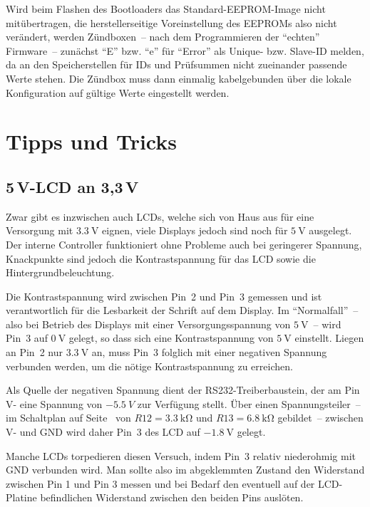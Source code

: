 \documentclass[paper=a4, parskip, numbers=noenddot, toc=listof, headsepline]{scrbook}
\begin{document}
				Wird beim Flashen des Bootloaders das Standard-EEPROM-Image nicht mitübertragen, die herstellerseitige Voreinstellung des EEPROMs also nicht verändert, werden Zündboxen~-- nach dem Programmieren der \enquote{echten} Firmware~-- zunächst \enquote{E} bzw. \enquote{e} für \enquote{Error} als Unique- bzw. Slave-ID melden, da an den Speicherstellen für IDs und Prüfsummen nicht zueinander passende Werte stehen. Die Zündbox muss dann einmalig kabelgebunden über die lokale Konfiguration auf gültige Werte eingestellt werden.

		\chapter{Tipps und Tricks}

			\section[5V-LCD an 3,3V]{5\,V-LCD an 3,3\,V}

				Zwar gibt es inzwischen auch LCDs, welche sich von Haus aus für eine Versorgung mit $\SI{3,3}{\volt}$ eignen, viele Displays jedoch sind noch für $\SI{5}{\volt}$ ausgelegt. Der interne Controller funktioniert ohne Probleme auch bei geringerer Spannung, Knackpunkte sind jedoch die Kontrastspannung für das LCD sowie die Hintergrundbeleuchtung.

				Die Kontrastspannung wird zwischen Pin~2 und Pin~3 gemessen und ist verantwortlich für die Lesbarkeit der Schrift auf dem Display. Im \enquote{Normalfall}~-- also bei Betrieb des Displays mit einer Versorgungsspannung von $\SI{5}{\volt}$~-- wird Pin~3 auf $\SI{0}{\volt}$ gelegt, so dass sich eine Kontrastspannung von $\SI{5}{\volt}$ einstellt. Liegen an Pin~2 nur $\SI{3,3}{\volt}$ an, muss Pin~3 folglich mit einer negativen Spannung verbunden werden, um die nötige Kontrastspannung zu erreichen.

				Als Quelle der negativen Spannung dient der RS232-Treiberbaustein, der am Pin V- eine Spannung von $\SI{-5,5}{V}$ zur Verfügung stellt. Über einen Spannungsteiler~-- im Schaltplan auf Seite~\pageref{fig:transmitterschematic} von $R12 = \SI{3,3}{\kilo\ohm}$ und $R13 = \SI{6,8}{\kilo\ohm}$ gebildet~-- zwischen V- und GND wird daher Pin~3 des LCD auf $\SI{-1,8}{\volt}$ gelegt.

				Manche LCDs torpedieren diesen Versuch, indem Pin~3 relativ niederohmig mit GND verbunden wird. Man sollte also im abgeklemmten Zustand den Widerstand zwischen Pin 1 und Pin 3 messen und bei Bedarf den eventuell auf der LCD-Platine befindlichen Widerstand zwischen den beiden Pins auslöten.
\end{document}
